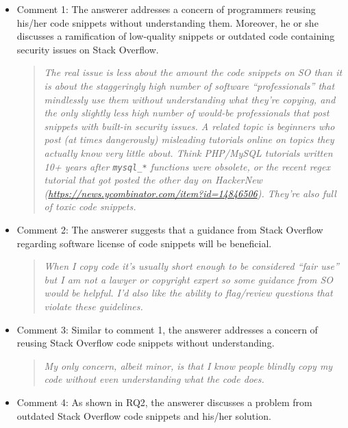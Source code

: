 \documentclass{svjour3}                     %
\begin{document}
\begin{itemize}[label={}] \itemsep1em \item Comment 1: The answerer addresses a
	concern of programmers reusing his/her code snippets without understanding them.
	Moreover, he or she discusses a ramification of low-quality snippets or outdated
	code containing security issues on Stack Overflow.
	
	\begin{quote}\textit{The real issue is less about the amount the code snippets
			on SO than it is about the staggeringly high number of software
			``professionals'' that mindlessly use them without understanding what they're
			copying, and the only slightly less high number of would-be professionals that
			post snippets with built-in security issues.  A related topic is beginners who
			post (at times dangerously) misleading tutorials online on topics they actually
			know very little about. Think PHP/MySQL tutorials written 10+ years after
			\texttt{mysql\_*} functions were obsolete, or the recent regex tutorial that
			got posted the other day on HackerNew
			(\url{https://news.ycombinator.com/item?id=14846506}). They're also full of
			toxic code snippets.}\end{quote}
	
	\item Comment 2: The answerer suggests that a guidance from Stack Overflow
	regarding software license of code snippets will be beneficial.
	
	\begin{quote}\textit{When I copy code it's usually short enough to be
			considered ``fair use'' but I am not a lawyer or copyright expert so some
			guidance from SO would be helpful. I'd also like the ability to flag/review
			questions that violate these guidelines.}\end{quote}
	
	\item Comment 3: Similar to comment 1, the answerer addresses a concern of
reusing Stack Overflow code snippets without understanding.
	
	\begin{quote}\textit{My only concern, albeit minor, is that I know people
			blindly copy my code without even understanding what the code does.}\end{quote}
	
	\item Comment 4: As shown in RQ2, the answerer discusses a problem from outdated Stack Overflow code snippets and
	his/her solution.
	

\end{itemize}
\end{document}
